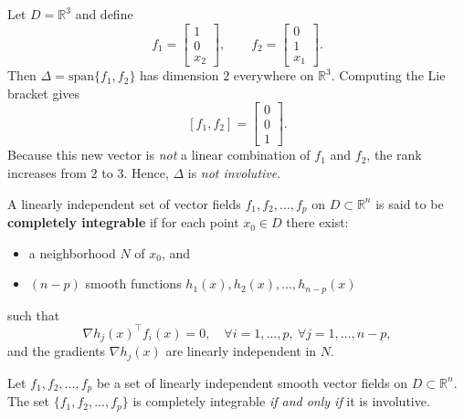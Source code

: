 \begin{example}
Let $D = \mathbb{R}^3$ and define
\[
f_1 =
\begin{bmatrix}
1 \\[3pt]
0 \\[3pt]
x_2
\end{bmatrix},
\qquad
f_2 =
\begin{bmatrix}
0 \\[3pt]
1 \\[3pt]
x_1
\end{bmatrix}.
\]
Then $\Delta = \mathrm{span}\{ f_1, f_2 \}$ has dimension $2$ everywhere on $\mathbb{R}^3$.  
Computing the Lie bracket gives
\[
[f_1, f_2] =
\begin{bmatrix}
0 \\[3pt]
0 \\[3pt]
1
\end{bmatrix}.
\]
Because this new vector is \emph{not} a linear combination of $f_1$ and $f_2$,  
the rank increases from $2$ to $3$.  
Hence, $\Delta$ is \emph{not involutive}.
\end{example}

\begin{definition}\label{def:complete_integrability}
A linearly independent set of vector fields $f_1, f_2, \ldots, f_p$ on $D \subset \mathbb{R}^n$  
is said to be \textbf{completely integrable} if for each point $x_0 \in D$ there exist:
\begin{itemize}
    \item a neighborhood $N$ of $x_0$, and  
    \item $(n-p)$ smooth functions $h_1(x), h_2(x), \ldots, h_{n-p}(x)$
\end{itemize}
such that
\[
\nabla h_j(x)^\top f_i(x) = 0, 
\quad \forall i = 1, \ldots, p, \ \forall j = 1, \ldots, n-p,
\]
and the gradients $\nabla h_j(x)$ are linearly independent in $N$.
\end{definition}

\begin{theorem}\label{thm:Frobenius}
Let $f_1, f_2, \ldots, f_p$ be a set of linearly independent smooth vector fields on 
$D \subset \mathbb{R}^n$.  
The set $\{ f_1, f_2, \ldots, f_p \}$ is completely integrable \emph{if and only if}  
it is involutive.
\end{theorem}

